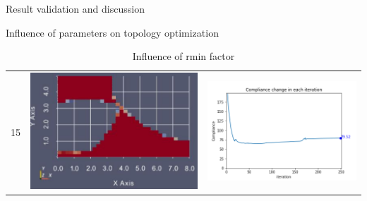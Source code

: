\documentclass[a4paper,12pt,times]{article}
\begin{document}
\begin{section}{Result validation and discussion}
\begin{subsection}{Influence of parameters on topology optimization}
\begin{center}
\begin{table} [H]
\begin{tabular}{c|c|c}
15&\includegraphics[scale = 0.5]{rmin_15.png} & \includegraphics[scale = 0.4]{MMA_ComplianceVSiteration_rmin_15.png}\\ 
\end{tabular} 
\caption{Influence of rmin factor} 
\label{table:2} 
\end{table} 
\end{center} 

\end{subsection}
\end{section}
\end{document}
